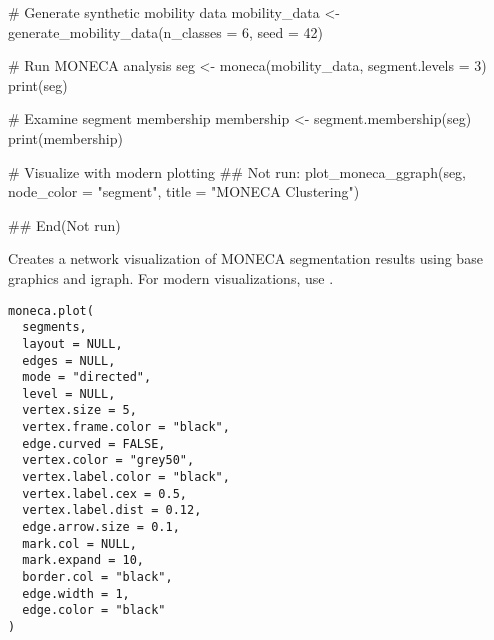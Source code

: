\documentclass[a4paper]{book}
\begin{document}
%
\begin{Examples}
\begin{ExampleCode}
# Generate synthetic mobility data
mobility_data <- generate_mobility_data(n_classes = 6, seed = 42)

# Run MONECA analysis
seg <- moneca(mobility_data, segment.levels = 3)
print(seg)

# Examine segment membership
membership <- segment.membership(seg)
print(membership)

# Visualize with modern plotting
## Not run: 
plot_moneca_ggraph(seg, node_color = "segment", title = "MONECA Clustering")

## End(Not run)

\end{ExampleCode}
\end{Examples}
%
\begin{Description}
Creates a network visualization of MONECA segmentation results using base
graphics and igraph. For modern visualizations, use .
\end{Description}
%
\begin{Usage}
\begin{verbatim}
moneca.plot(
  segments,
  layout = NULL,
  edges = NULL,
  mode = "directed",
  level = NULL,
  vertex.size = 5,
  vertex.frame.color = "black",
  edge.curved = FALSE,
  vertex.color = "grey50",
  vertex.label.color = "black",
  vertex.label.cex = 0.5,
  vertex.label.dist = 0.12,
  edge.arrow.size = 0.1,
  mark.col = NULL,
  mark.expand = 10,
  border.col = "black",
  edge.width = 1,
  edge.color = "black"
)
\end{verbatim}
\end{Usage}
%
\end{document}
